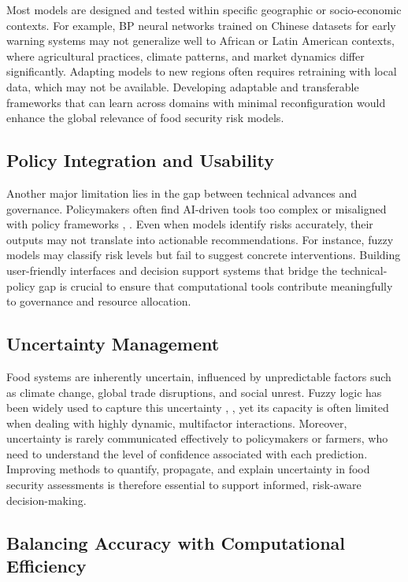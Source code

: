 \documentclass[preprint,12pt]{elsarticle}
\begin{document}
	Most models are designed and tested within specific geographic or
	socio-economic contexts. For example, BP neural networks trained on
	Chinese datasets for early warning systems \cite{ref11} may not generalize
	well to African or Latin American contexts, where agricultural
	practices, climate patterns, and market dynamics differ significantly.
	Adapting models to new regions often requires retraining with local
	data, which may not be available. Developing adaptable and transferable
	frameworks that can learn across domains with minimal reconfiguration
	would enhance the global relevance of food security risk models.
	
	\subsection{Policy Integration and Usability}
	
	Another major limitation lies in the gap between technical advances and
	governance. Policymakers often find AI-driven tools too complex or
	misaligned with policy frameworks \cite{ref4}, \cite{ref63}. Even when models
	identify risks accurately, their outputs may not translate into
	actionable recommendations. For instance, fuzzy models may classify risk
	levels but fail to suggest concrete interventions. Building
	user-friendly interfaces and decision support systems that bridge the
	technical-policy gap is crucial to ensure that computational tools
	contribute meaningfully to governance and resource allocation.
	
	\subsection{Uncertainty Management}
	
	Food systems are inherently uncertain, influenced by unpredictable
	factors such as climate change, global trade disruptions, and social
	unrest. Fuzzy logic has been widely used to capture this uncertainty
	\cite{ref9}, \cite{ref4}, yet its capacity is often limited when dealing with highly
	dynamic, multifactor interactions. Moreover, uncertainty is rarely
	communicated effectively to policymakers or farmers, who need to
	understand the level of confidence associated with each prediction.
	Improving methods to quantify, propagate, and explain uncertainty in
	food security assessments is therefore essential to support informed,
	risk-aware decision-making.
	
	\subsection{Balancing Accuracy with Computational Efficiency}
	
\end{document}
